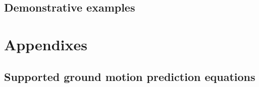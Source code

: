 \documentclass[12pt,a4paper,headings=small,version=last,dvips]{scrbook}
\begin{document}
\chapter{Demonstrative examples}
	\label{chap:riskexamples}
	
%	
\part{Appendixes}
\appendix
\chapter{Supported ground motion prediction equations}
	
\end{document}

